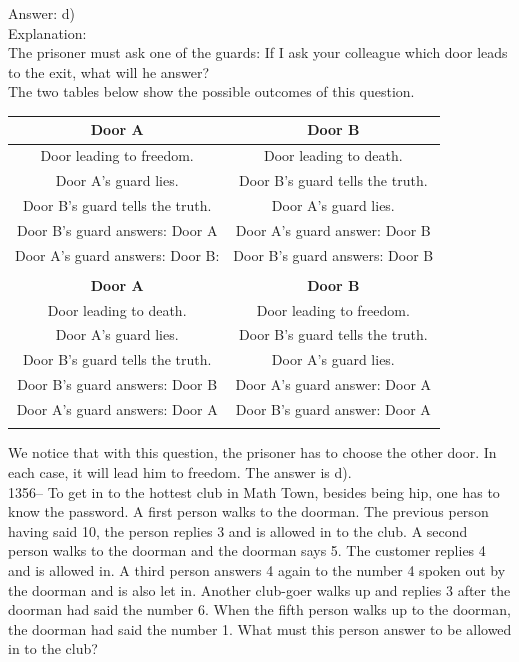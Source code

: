 \documentclass[letterpaper, 12pt]{article}
\begin{document}
Answer: d)\\

Explanation: \\
The prisoner must ask one of the guards:
\og If I ask your colleague which door leads to the exit, what will he answer?\fg \\
The two tables below show the possible outcomes of this question.
  \\


\begin{tabular}{|c|c|} \hline
{\bf Door A      }          & {\bf Door B}  \\ \hline \hline

Door leading to freedom.                 &  Door leading to death.
\\
\hline Door A's guard lies. & Door B's guard tells the truth. \\
\hline
Door B's guard tells the truth. &  Door A's guard lies. \\
\hline Door B's guard answers: Door A & Door A's guard answer: Door B\\
\hline Door A's guard answers: Door B:  & Door B's guard answers:
Door B\\ \hline


\multicolumn{2}{c}{}\\
\hline
{\bf Door A}                & {\bf Door B}  \\ \hline \hline

Door leading to death.                 & Door leading to freedom. \\
\hline
Door A's guard lies.      & Door B's guard tells the truth. \\
\hline  Door B's guard tells the truth.  & Door A's guard lies.
\\ \hline Door B's guard answers: Door B & Door A's guard answer: Door A\\ \hline Door A's guard answers: Door A & Door B's guard answer: Door A \\ \hline
\multicolumn{2}{c}{}\\
\end{tabular}

We notice that with this question, the prisoner has to choose the other door. In each case, it will lead him to freedom. The answer is d).\\

1356--  To get in to the hottest club in Math Town, besides being hip, one has to know the password. A first person walks to the doorman. The previous person having said 10, the person replies 3 and is allowed in to the club. A second person walks to the doorman and the doorman says 5. The customer replies 4 and is allowed in. A third person answers 4 again to the number 4 spoken out by the doorman and is also let in. Another club-goer walks up and replies 3 after the doorman had said the number 6. When the fifth person walks up to the doorman, the doorman had said the number 1. What must this person answer to be allowed in to the club?\\
\end{document}

